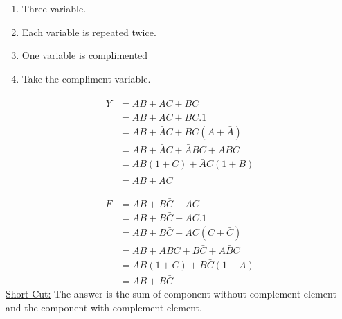 \documentclass[a4aper,12pt]{report}
\newcounter{examplebox}[chapter]
\begin{document}
\begin{enumerate}
    \item Three variable.
    \item Each variable is repeated twice.
    \item One variable is complimented
    \item Take the compliment variable.
\end{enumerate}
\begin{examplebox}[Simplify \ensuremath{Y = AB + A\bar{C} + BC}  ]
   
   \begin{align*}
   Y&=AB+\bar{A}C+BC\\
    &=AB+\bar{A}C+BC.1\\
    &=AB+\bar{A}C+BC(A+\bar{A})\\
    &=AB+\bar{A}C+\bar{A}BC+ABC\\
    &=AB(1+C)+\bar{A}C(1+B)\\
    &=AB+\bar{A}C
   \end{align*} 

\end{examplebox}
 \vspace{10pt}

 \begin{examplebox}[Simplify \ensuremath{F=AB+\bar{B}C+AC}]
    \begin{align*}
        F&=AB+B\bar{C}+AC\\
         &=AB+B\bar{C}+AC.1\\
         &=AB+B\bar{C}+AC(C+\bar{C})\\
         &=AB+ABC+B\bar{C}+A\bar{B}C\\
         &=AB(1+C)+B\bar{C}(1+A)\\
         &=AB+B\bar{C}
    \end{align*}
\underline{Short Cut:} The answer is the sum of  component without complement element  and the component with complement element.\\
 \end{examplebox}
\vspace{10pt}
\end{document}
